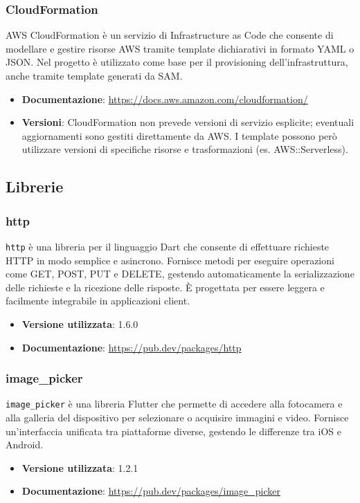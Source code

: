\documentclass[a4paper,12pt]{article}
\begin{document}
\subsubsection{CloudFormation}
AWS CloudFormation è un servizio di Infrastructure as Code che consente di modellare e gestire risorse AWS tramite template dichiarativi in formato YAML o JSON. Nel progetto è utilizzato come base per il provisioning dell'infrastruttura, anche tramite template generati da SAM.
\begin{itemize}
    \item \textbf{Documentazione}: \url{https://docs.aws.amazon.com/cloudformation/}
    \item \textbf{Versioni}: CloudFormation non prevede versioni di servizio esplicite; eventuali aggiornamenti sono gestiti direttamente da AWS. I template possono però utilizzare versioni di specifiche risorse e trasformazioni (es. AWS::Serverless).
\end{itemize}

\subsection{Librerie} \label{subsec:librerie}

\subsubsection{http}
\texttt{http} è una libreria per il linguaggio Dart che consente di effettuare richieste HTTP in modo semplice e asincrono. Fornisce metodi per eseguire operazioni come GET, POST, PUT e DELETE, gestendo automaticamente la serializzazione delle richieste e la ricezione delle risposte. È progettata per essere leggera e facilmente integrabile in applicazioni client.
\begin{itemize}
    \item \textbf{Versione utilizzata}: 1.6.0
    \item \textbf{Documentazione}: \url{https://pub.dev/packages/http}
\end{itemize}

\subsubsection{image\_picker}
\texttt{image\_picker} è una libreria Flutter che permette di accedere alla fotocamera e alla galleria del dispositivo per selezionare o acquisire immagini e video. Fornisce un'interfaccia unificata tra piattaforme diverse, gestendo le differenze tra iOS e Android.
\begin{itemize}
    \item \textbf{Versione utilizzata}: 1.2.1
    \item \textbf{Documentazione}: \url{https://pub.dev/packages/image_picker}
\end{itemize}
\end{document}
